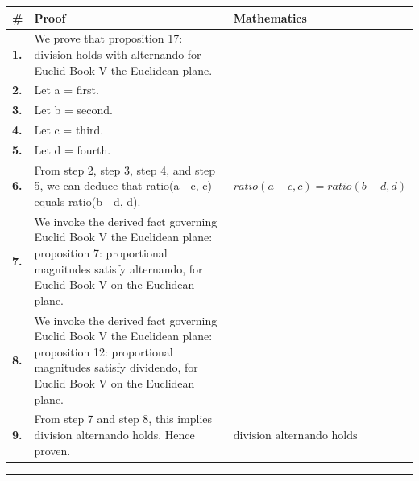 \documentclass[11pt]{article}
\theoremstyle{definition}
\begin{document}
\begin{tabular}{@{} >{\raggedright\arraybackslash}p{} >{\raggedright\arraybackslash}p{} >{\raggedleft\arraybackslash}p{} @{}}
\textbf{\#} & \textbf{Proof} & \textbf{Mathematics} \\
\midrule
\textbf{1.} & We prove that proposition 17: division holds with alternando for Euclid Book V the Euclidean plane. & \\[0.45em]
\textbf{2.} & Let a = first. & \\[0.45em]
\textbf{3.} & Let b = second. & \\[0.45em]
\textbf{4.} & Let c = third. & \\[0.45em]
\textbf{5.} & Let d = fourth. & \\[0.45em]
\textbf{6.} & From step 2, step 3, step 4, and step 5, we can deduce that ratio(a - c, c) equals ratio(b - d, d). & $\displaystyle ratio(a - c, c) = ratio(b - d, d)$ \\[0.45em]
\textbf{7.} & We invoke the derived fact governing Euclid Book V the Euclidean plane: proposition 7: proportional magnitudes satisfy alternando, for Euclid Book V on the Euclidean plane. & \\[0.45em]
\textbf{8.} & We invoke the derived fact governing Euclid Book V the Euclidean plane: proposition 12: proportional magnitudes satisfy dividendo, for Euclid Book V on the Euclidean plane. & \\[0.45em]
\textbf{9.} & From step 7 and step 8, this implies division alternando holds. Hence proven. & $\displaystyle \text{division alternando holds}$ \\[0.45em]
\bottomrule
\end{tabular}
\label{thm:Geometry-Euclid Book V-proposition_17_division_holds_with_alternando}
\par\medskip\hrule
\end{document}
